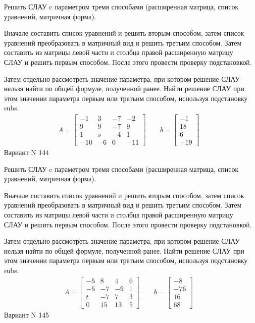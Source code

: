 \documentclass[11pt]{report}
\begin{document}
Решить СЛАУ c параметром тремя способами (расширенная матрица, список уравнений, матричная форма).

Вначале составить список уравнений и решить вторым способом,
затем список уравнений преобразовать в матричный вид и решить третьим способом.
Затем составить из матрицы левой части и столбца правой расширенную матрицу СЛАУ и решить первым способом.
После этого провести проверку подстановкой.

Затем отдельно рассмотреть значение параметра, при котором решение СЛАУ нельзя найти по общей формуле,
полученной ранее.
Найти решение СЛАУ при этом значении параметра первым или третьим способом, используя подстановку subs.
\begin{align*}
    A = \left[\begin{matrix}-1 & 3 & -7 & -2\\9 & 9 & -7 & 9\\1 & s & -4 & 1\\-10 & -6 & 0 & -11\end{matrix}\right]
\qquad b = \left[\begin{matrix}-1\\18\\6\\-19\end{matrix}\right]
\end{align*}
\newpage
Вариант N 144


Решить СЛАУ c параметром тремя способами (расширенная матрица, список уравнений, матричная форма).

Вначале составить список уравнений и решить вторым способом,
затем список уравнений преобразовать в матричный вид и решить третьим способом.
Затем составить из матрицы левой части и столбца правой расширенную матрицу СЛАУ и решить первым способом.
После этого провести проверку подстановкой.

Затем отдельно рассмотреть значение параметра, при котором решение СЛАУ нельзя найти по общей формуле,
полученной ранее.
Найти решение СЛАУ при этом значении параметра первым или третьим способом, используя подстановку subs.
\begin{align*}
    A = \left[\begin{matrix}-5 & 8 & 4 & 6\\-5 & -7 & -9 & 1\\t & -7 & 7 & 3\\0 & 15 & 13 & 5\end{matrix}\right]
\qquad b = \left[\begin{matrix}-8\\-76\\16\\68\end{matrix}\right]
\end{align*}
\newpage
Вариант N 145
\end{document}
